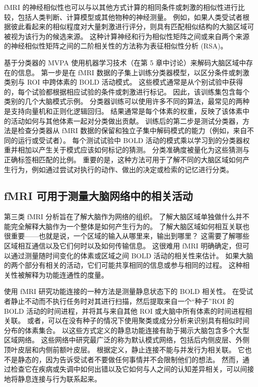 fMRI 的神经相似性也可以与以其他方式计算的相同条件或刺激的相似性进行比较，包括人类判断、计算模型或其他物种的神经测量。 例如，如果人类受试者根据彼此看起来的相似程度对大量刺激进行评分，则具有匹配相似结构的大脑区域可被视为该行为的候选来源。 这种计算神经和行为相似性矩阵之间或来自两个来源的神经相似性矩阵之间的二阶相关性的方法称为表征相似性分析 (RSA)。

基于分类器的 MVPA 使用机器学习技术（在第 5 章中讨论）来解码大脑区域中存在的信息。 第一步是在 fMRI 数据的子集上训练分类器模型，以区分条件或刺激类别与 ROI 中跨体素的 BOLD 活动模式。 这些模式通常是从个别试验中获得的，每个试验都根据相应试验的条件或刺激进行标记。 因此，该训练集包含每个类别的几个大脑模式示例。 分类器训练可以使用许多不同的算法，最常见的两种是支持向量机和正则化逻辑回归。 结果通常是每个体素的权重，反映了该体素中的活动如何与其他体素一起对分类做出贡献。 训练后的第二步是测试分类器，方法是检查分类器从 fMRI 数据的保留和独立子集中解码模式的能力（例如，来自不同的运行或受试者）。 每个测试试验中 BOLD 活动的模式乘以学习到的分类器权重并相加以产生关于模式应该如何标记的猜测。 分类准确度被量化为这些猜测与正确标签相匹配的比例。 重要的是，这种方法可用于了解不同的大脑区域如何产生行为，例如通过尝试对执行的动作、做出的决定或检索的记忆进行分类。



\subsection{fMRI 可用于测量大脑网络中的相关活动}

第三类 fMRI 分析旨在了解大脑作为网络的组织。 了解大脑区域单独做什么并不能完全解释大脑作为一个整体是如何产生行为的。 了解大脑区域如何相互关联也很重要——也就是说，一个区域的输入从哪里来，输出到哪里？ 这需要了解哪些区域相互通信以及它们何时以及如何传输信息。 这很难用 fMRI 明确确定，但可以通过测量随时间变化的体素或区域之间 BOLD 活动的相关性来估计。 如果大脑的两个部分有相关的活动，它们可能共享相同的信息或参与相同的过程。 这种相关性被解释为功能连通性的度量。

使用 fMRI 研究功能连接的一种方法是测量静息状态下的 BOLD 相关性。 在受试者静止不动而不执行任务时对其进行扫描，然后提取来自一个“种子”ROI 的 BOLD 活动的时间进程，并将其与来自其他 ROI 或大脑中所有体素的时间进程相关联。 或者，可以在没有种子的情况下使用聚类或成分分析来识别具有相似时间分布的体素集合。 以这些方式定义的静息功能连接有助于揭示大脑包含多个大型区域网络。 这些网络中研究最广泛的称为默认模式网络，包括后内侧皮层、外侧顶叶皮层和内侧前额叶皮层。 根据定义，静止连接不能与并发行为相关联。 它也不是静态的，因为告诉受试者不要做任何事情并不会限制他们的想法。 然而，通过检查它在疾病或失调中如何出错以及它如何与人之间的认知差异相关，可以间接地将静息连接与行为联系起来。

